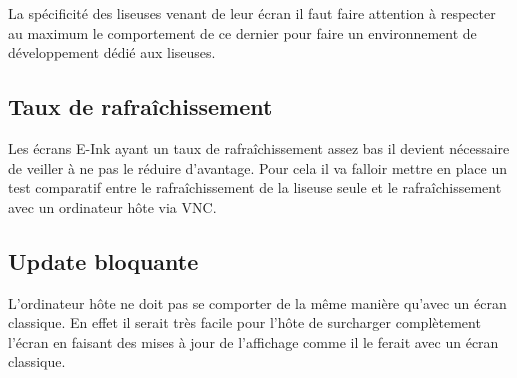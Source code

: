 La spécificité des liseuses venant de leur écran il faut faire attention à respecter au maximum le comportement de ce dernier pour faire un environnement de développement dédié aux liseuses.

\subsection{Taux de rafraîchissement}

Les écrans E-Ink ayant un taux de rafraîchissement assez bas il devient nécessaire de veiller à ne pas le réduire d'avantage.
Pour cela il va falloir mettre en place un test comparatif entre le rafraîchissement de la liseuse seule et le rafraîchissement avec un ordinateur hôte via VNC.

\subsection{Update bloquante}

L'ordinateur hôte ne doit pas se comporter de la même manière qu'avec un écran classique. En effet il serait très facile pour l'hôte de surcharger complètement l'écran en faisant des mises à jour de l'affichage comme il le ferait avec un écran classique. %
